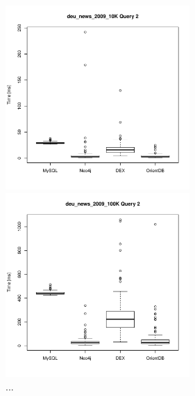 \documentclass[11pt, a4paper, oneside]{article} %
\begin{document}
\begin{appendix}
\begin{figure}[ht]
\begin{minipage}[hbt]{7cm}
	\centering
	\includegraphics[width=7cm]{../results/cold caches/images/10K_query2_boxplot}
	\caption{...}
	\label{fig:10k_query2_boxplot}
\end{minipage}
\hfill
\begin{minipage}[hbt]{7cm}
	\centering
	\includegraphics[width=7cm]{../results/cold caches/images/100K_query2_boxplot}
	\caption{...}
	\label{fig:100k_query2_boxplot}
\end{minipage}


\end{figure}
\end{appendix}
\end{document}
